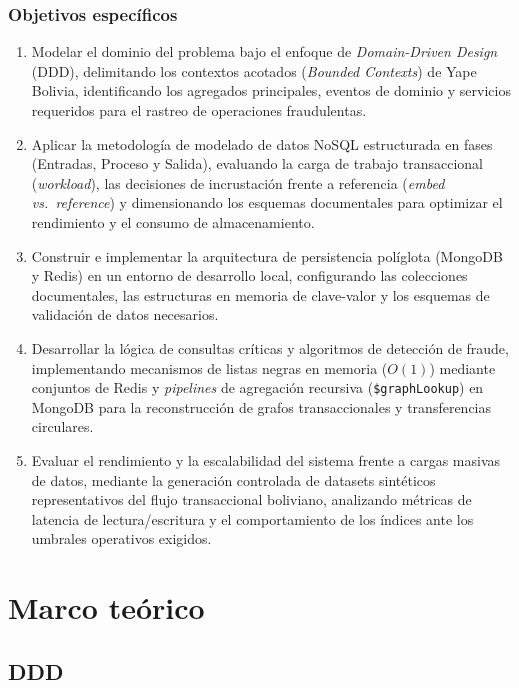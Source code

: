 \documentclass[11pt,a4paper]{article}
\begin{document}
	\subsubsection*{Objetivos específicos}
	\begin{enumerate}[leftmargin=2em]
		\item Modelar el dominio del problema bajo el enfoque de \textit{Domain-Driven Design} (DDD), delimitando los contextos acotados (\textit{Bounded Contexts}) de Yape Bolivia, identificando los agregados principales, eventos de dominio y servicios requeridos para el rastreo de operaciones fraudulentas.
		\item Aplicar la metodología de modelado de datos NoSQL estructurada en fases (Entradas, Proceso y Salida), evaluando la carga de trabajo transaccional (\textit{workload}), las decisiones de incrustación frente a referencia (\textit{embed vs.\ reference}) y dimensionando los esquemas documentales para optimizar el rendimiento y el consumo de almacenamiento.
		\item Construir e implementar la arquitectura de persistencia políglota (MongoDB y Redis) en un entorno de desarrollo local, configurando las colecciones documentales, las estructuras en memoria de clave-valor y los esquemas de validación de datos necesarios.
		\item Desarrollar la lógica de consultas críticas y algoritmos de detección de fraude, implementando mecanismos de listas negras en memoria ($O(1)$) mediante conjuntos de Redis y \textit{pipelines} de agregación recursiva (\texttt{\$graphLookup}) en MongoDB para la reconstrucción de grafos transaccionales y transferencias circulares.
		\item Evaluar el rendimiento y la escalabilidad del sistema frente a cargas masivas de datos, mediante la generación controlada de datasets sintéticos representativos del flujo transaccional boliviano, analizando métricas de latencia de lectura/escritura y el comportamiento de los índices ante los umbrales operativos exigidos.
	\end{enumerate}
	
	\section{Marco teórico}
	
	\subsection{DDD}
	
\end{document}
